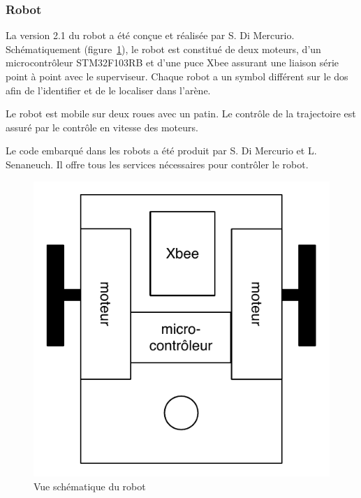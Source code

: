   \subsubsection{Robot}

La version 2.1 du robot a été conçue et réalisée par S. Di Mercurio. Schématiquement (figure~\ref{fig:robot}), le robot est constitué de deux moteurs, d'un microcontrôleur STM32F103RB et d'une puce Xbee assurant une liaison série point à point avec le superviseur. Chaque robot a un symbol différent sur le dos afin de l'identifier et de le localiser dans l'arène.

Le robot est mobile sur deux roues avec un patin. Le contrôle de la trajectoire est assuré par le contrôle en vitesse des moteurs. 

Le code embarqué dans les robots a été produit par S. Di Mercurio et L. Senaneuch. Il offre tous les services nécessaires pour contrôler le robot.
 
 \begin{figure}[htbp]
\begin{center}
\includegraphics[scale=.6]{figures_pdf/schema_robot.pdf}
\caption{Vue schématique du robot}
\label{fig:robot}
\end{center}
\end{figure}
\FloatBarrier

\noindent{}\\

